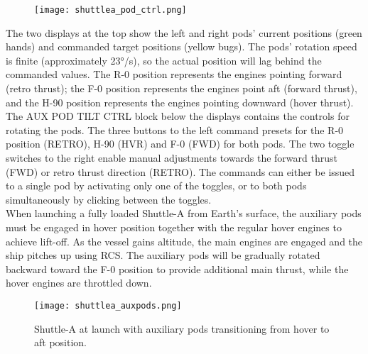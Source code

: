 \documentclass[Orbiter User Manual.tex]{subfiles}
\begin{document}
\begin{figure}[H]
  \centering
  \texttt{[image: shuttlea\_pod\_ctrl.png]}
\end{figure}

\noindent
The two displays at the top show the left and right pods' current positions (green hands) and commanded target positions (yellow bugs). The pods' rotation speed is finite (approximately 23°/s), so the actual position will lag behind the commanded values. The R-0 position represents the engines pointing forward (retro thrust); the F-0 position represents the engines point aft (forward thrust), and the H-90 position represents the engines pointing downward (hover thrust).\\
The AUX POD TILT CTRL block below the displays contains the controls for rotating the pods. The three buttons to the left command presets for the R-0 position (RETRO), H-90 (HVR) and F-0 (FWD) for both pods. The two toggle switches to the right enable manual adjustments towards the forward thrust (FWD) or retro thrust direction (RETRO). The commands can either be issued to a single pod by activating only one of the toggles, or to both pods simultaneously by clicking between the toggles.\\
When launching a fully loaded Shuttle-A from Earth's surface, the auxiliary pods must be engaged in hover position together with the regular hover engines to achieve lift-off. As the vessel gains altitude, the main engines are engaged and the ship pitches up using RCS. The auxiliary pods will be gradually rotated backward toward the F-0 position to provide additional main thrust, while the hover engines are throttled down.


\begin{figure}[H]
  \centering
  \texttt{[image: shuttlea\_auxpods.png]}
  \caption{Shuttle-A at launch with auxiliary pods transitioning from hover to aft position.}
\end{figure}
\end{document}
